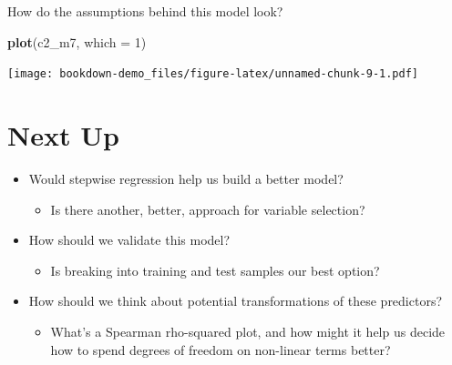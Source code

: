 \documentclass[]{book}
\newenvironment{Shaded}{\begin{snugshade}}{\end{snugshade}}
\newcommand{\KeywordTok}[1]{\textcolor[rgb]{0.13,0.29,0.53}{\textbf{#1}}}
\newcommand{\DataTypeTok}[1]{\textcolor[rgb]{0.13,0.29,0.53}{#1}}
\newcommand{\DecValTok}[1]{\textcolor[rgb]{0.00,0.00,0.81}{#1}}
\newcommand{\NormalTok}[1]{#1}
\providecommand{\tightlist}{%
  \setlength{\itemsep}{0pt}\setlength{\parskip}{0pt}}
\theoremstyle{definition}
\theoremstyle{definition}
\theoremstyle{definition}
\theoremstyle{remark}
\begin{document}
How do the assumptions behind this model look?

\begin{Shaded}
\begin{Highlighting}[]
\KeywordTok{plot}\NormalTok{(c2_m7, }\DataTypeTok{which =} \DecValTok{1}\NormalTok{)}
\end{Highlighting}
\end{Shaded}

\texttt{[image: bookdown-demo\_files/figure-latex/unnamed-chunk-9-1.pdf]}

\section{Next Up}\label{next-up}

\begin{itemize}
\tightlist
\item
  Would stepwise regression help us build a better model?

  \begin{itemize}
  \tightlist
  \item
    Is there another, better, approach for variable selection?
  \end{itemize}
\item
  How should we validate this model?

  \begin{itemize}
  \tightlist
  \item
    Is breaking into training and test samples our best option?
  \end{itemize}
\item
  How should we think about potential transformations of these
  predictors?

  \begin{itemize}
  \tightlist
  \item
    What's a Spearman rho-squared plot, and how might it help us decide
    how to spend degrees of freedom on non-linear terms better?
  \end{itemize}
\end{itemize}


\end{document}
